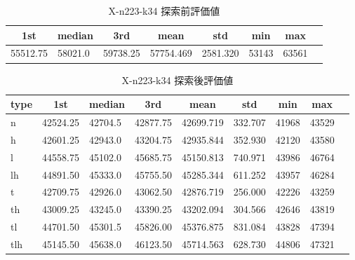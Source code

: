 \begin{table}[htbp]
    \caption{X-n223-k34 探索前評価値}
    \begin{tabular}{|l|l|l|l|l|l|l|l|}\hline
    \multicolumn{1}{|c|}{\textbf{1st}}
    &\multicolumn{1}{c|}{\textbf{median}}
    &\multicolumn{1}{c|}{\textbf{3rd}}
    &\multicolumn{1}{c|}{\textbf{mean}}
    &\multicolumn{1}{c|}{\textbf{std}}
    &\multicolumn{1}{c|}{\textbf{min}}
    &\multicolumn{1}{c|}{\textbf{max}}\\\hline
	55512.75 & 58021.0 & 59738.25 & 57754.469 & 2581.320 & 53143 & 63561\\\hline
	\end{tabular}
\end{table}
\begin{table}[htbp]
    \caption{X-n223-k34 探索後評価値}
    \begin{tabular}{|l|l|l|l|l|l|l|l|l|}\hline
    \multicolumn{1}{|c|}{\textbf{type}}
    &\multicolumn{1}{|c|}{\textbf{1st}}
    &\multicolumn{1}{c|}{\textbf{median}}
    &\multicolumn{1}{c|}{\textbf{3rd}}
    &\multicolumn{1}{c|}{\textbf{mean}}
    &\multicolumn{1}{c|}{\textbf{std}}
    &\multicolumn{1}{c|}{\textbf{min}}
    &\multicolumn{1}{c|}{\textbf{max}}\\\hline
	n & 42524.25 & 42704.5 & 42877.75 & 42699.719 & 332.707 & 41968 & 43529\\\hline
	h & 42601.25 & 42943.0 & 43204.75 & 42935.844 & 352.930 & 42120 & 43580\\\hline
	l & 44558.75 & 45102.0 & 45685.75 & 45150.813 & 740.971 & 43986 & 46764\\\hline
	lh & 44891.50 & 45333.0 & 45755.50 & 45285.344 & 611.252 & 43957 & 46284\\\hline
	t & 42709.75 & 42926.0 & 43062.50 & 42876.719 & 256.000 & 42226 & 43259\\\hline
	th & 43009.25 & 43245.0 & 43390.25 & 43202.094 & 304.566 & 42646 & 43819\\\hline
	tl & 44701.50 & 45301.5 & 45826.00 & 45376.875 & 831.084 & 43828 & 47394\\\hline
	tlh & 45145.50 & 45638.0 & 46123.50 & 45714.563 & 628.730 & 44806 & 47321\\\hline
	\end{tabular}
\end{table}

